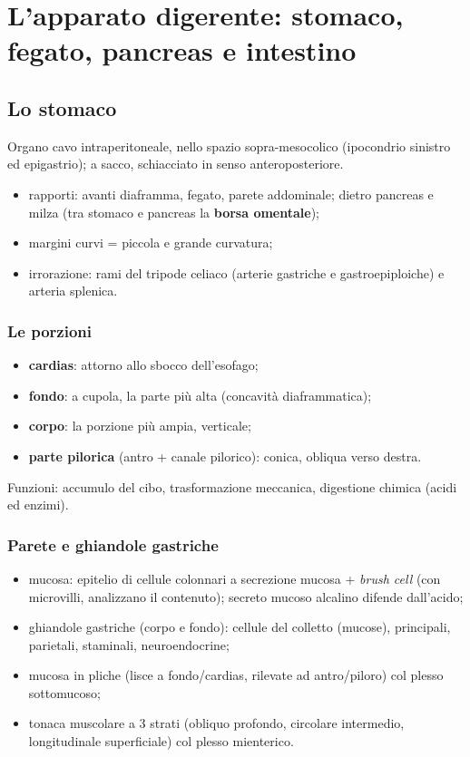 \chapter{L'apparato digerente: stomaco, fegato, pancreas e intestino}

\section{Lo stomaco}

Organo cavo intraperitoneale, nello spazio sopra-mesocolico (ipocondrio sinistro ed epigastrio); a
sacco, schiacciato in senso anteroposteriore.
\begin{itemize}
  \item rapporti: avanti diaframma, fegato, parete addominale; dietro pancreas e milza (tra stomaco
    e pancreas la \textbf{borsa omentale});
  \item margini curvi = piccola e grande curvatura;
  \item irrorazione: rami del tripode celiaco (arterie gastriche e gastroepiploiche) e arteria
    splenica.
\end{itemize}

\subsection{Le porzioni}
\begin{itemize}
  \item \textbf{cardias}: attorno allo sbocco dell'esofago;
  \item \textbf{fondo}: a cupola, la parte più alta (concavità diaframmatica);
  \item \textbf{corpo}: la porzione più ampia, verticale;
  \item \textbf{parte pilorica} (antro + canale pilorico): conica, obliqua verso destra.
\end{itemize}
Funzioni: accumulo del cibo, trasformazione meccanica, digestione chimica (acidi ed enzimi).

\subsection{Parete e ghiandole gastriche}
\begin{itemize}
  \item mucosa: epitelio di cellule colonnari a secrezione mucosa + \textit{brush cell} (con
    microvilli, analizzano il contenuto); secreto mucoso alcalino difende dall'acido;
  \item ghiandole gastriche (corpo e fondo): cellule del colletto (mucose), principali, parietali,
    staminali, neuroendocrine;
  \item mucosa in pliche (lisce a fondo/cardias, rilevate ad antro/piloro) col plesso sottomucoso;
  \item tonaca muscolare a 3 strati (obliquo profondo, circolare intermedio, longitudinale
    superficiale) col plesso mienterico.
\end{itemize}

